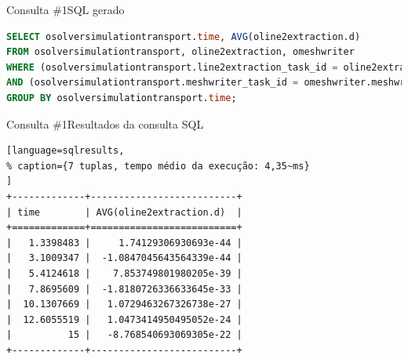 \documentclass[12pt,compress,final]{beamer}
\begin{document}

\begin{frame}[fragile]{Consulta \#1}{SQL gerado}

\begin{lstlisting}[language=sql,deletendkeywords={TIME},caption={tempo médio da geração: 40,29~ms}]
SELECT osolversimulationtransport.time, AVG(oline2extraction.d)
FROM osolversimulationtransport, oline2extraction, omeshwriter
WHERE (osolversimulationtransport.line2extraction_task_id = oline2extraction.line2extraction_task_id)
AND (osolversimulationtransport.meshwriter_task_id = omeshwriter.meshwriter_task_id)
GROUP BY osolversimulationtransport.time;
\end{lstlisting}

\end{frame}


\begin{frame}[fragile]{Consulta \#1}{Resultados da consulta SQL}

\begin{center}
\begin{lstlisting}[language=sqlresults,
% caption={7 tuplas, tempo médio da execução: 4,35~ms}
]
+-------------+--------------------------+
| time        | AVG(oline2extraction.d)  |
+=============+==========================+
|   1.3398483 |     1.74129306930693e-44 |
|   3.1009347 |  -1.0847045643564339e-44 |
|   5.4124618 |    7.853749801980205e-39 |
|   7.8695609 |  -1.8180726336633645e-33 |
|  10.1307669 |   1.0729463267326738e-27 |
|  12.6055519 |   1.0473414950495052e-24 |
|          15 |   -8.768540693069305e-22 |
+-------------+--------------------------+
\end{lstlisting}
\end{center}

\end{frame}

\end{document}
